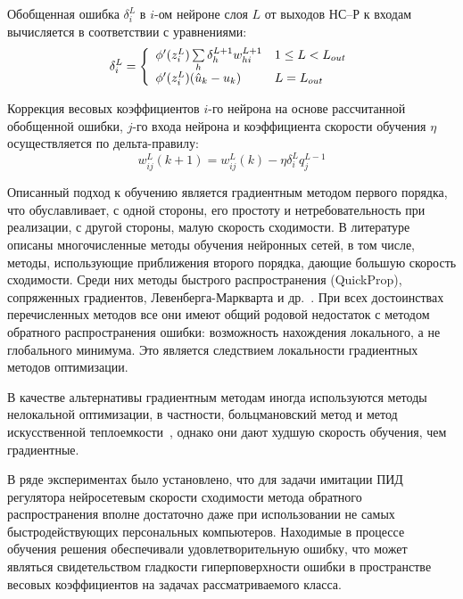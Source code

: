Обобщенная ошибка $\delta^L_i$ в $i$-ом нейроне слоя $L$ от выходов
НС--Р к входам вычисляется в соответствии с уравнениями:
\begin{equation}\label{eq:nnc-generalized-error}
  \delta^L_i=\left\{
  \begin{array}{ll}
    \fa'(z^L_i)\sum\limits_h\delta^{L+1}_h w^{L+1}_{hi} & 1\le L<L_{out} \\
    \fa'(z^L_i)(\hat{u}_k-u_k) & L=L_{out} \\
  \end{array}\right.
\end{equation}

Коррекция весовых коэффициентов $i$-го нейрона на основе рассчитанной
обобщенной ошибки, $j$-го входа нейрона и коэффициента скорости
обучения $\eta$ осуществляется по дельта-правилу:
\begin{equation}\label{eq:nnc-weights-update}
  w^L_{ij}(k+1)=w^L_{ij}(k)-\eta\delta^L_i q^{L-1}_j
\end{equation}

Описанный подход к обучению является градиентным методом первого
порядка, что обуславливает, с одной стороны, его простоту и
нетребовательность при реализации, с другой стороны, малую скорость
сходимости.  В литературе описаны многочисленные методы обучения
нейронных сетей, в том числе, методы, использующие приближения второго
порядка, дающие большую скорость сходимости.  Среди них методы
быстрого распространения (QuickProp), сопряженных градиентов,
Левенберга-Маркварта и др.~\cite{osov04,haykin2008,gibb96}.  При всех
достоинствах перечисленных методов все они имеют общий родовой
недостаток с методом обратного распространения ошибки: возможность
нахождения локального, а не глобального минимума.  Это является
следствием локальности градиентных методов оптимизации.

В качестве альтернативы градиентным методам иногда используются методы
нелокальной оптимизации, в частности, больцмановский метод и метод
искусственной теплоемкости~\cite{wasser92,golovko01}, однако они дают
худшую скорость обучения, чем градиентные.

В ряде экспериментах было установлено, что для задачи имитации ПИД
регулятора нейросетевым скорости сходимости метода обратного
распространения вполне достаточно даже при использовании не самых
быстродействующих персональных компьютеров.  Находимые в процессе
обучения решения обеспечивали удовлетворительную ошибку, что может
являться свидетельством гладкости гиперповерхности ошибки в
пространстве весовых коэффициентов на задачах рассматриваемого класса.

